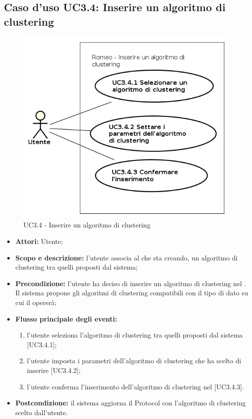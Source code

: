 \subsection{Caso d'uso UC3.4: Inserire un algoritmo di clustering}
\begin{figure}[!h]
\begin{center}
\includegraphics[scale=0.6]{./img/Use_Case/UC3_4}
\caption{UC3.4 - Inserire un algoritmo di clustering}
\end{center}
\end{figure}
\begin{itemize}
\item \textbf{Attori:} Utente;
\item \textbf{Scopo e descrizione:} l'utente associa al \protocol{} che sta creando, un algoritmo di clustering\glossario{} tra quelli proposti dal sistema;
\item \textbf{Precondizione:} l'utente ha deciso di inserire un algoritmo di clustering\glossario{} nel \protocol{}. Il sistema propone gli algoritmi di clustering\glossario{} compatibili con il tipo di dato su cui il \protocol{} opererà;
\item \textbf{Flusso principale degli eventi:}
\begin{enumerate}
\item l'utente seleziona l'algoritmo di clustering\glossario{} tra quelli proposti dal sistema [UC3.4.1];
\item l'utente imposta i parametri dell'algoritmo di clustering\glossario{} che ha scelto di inserire [UC3.4.2];
\item l'utente conferma l'inserimento dell'algoritmo di clustering\glossario{} nel \protocol{} [UC3.4.3].
\end{enumerate}
\item \textbf{Postcondizione:} il sistema aggiorna il Protocol\glossario{} con l'algoritmo di clustering\glossario{} scelto dall'utente.
\end{itemize}

